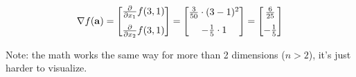 \documentclass[titlepage]{article}
\begin{document}
            \begin{align*}
              \nabla f(\mathbf{a})
                = \begin{bmatrix}
                    \vspace{1.5ex}
                    \frac{\partial}{\partial x_1} f(3, 1) \\
                    \frac{\partial}{\partial x_2} f(3, 1)
                  \end{bmatrix}
                = \begin{bmatrix}
                    \vspace{1.5ex}
                    \frac{3}{50} \cdot (3 - 1)^2 \\
                    - \frac{1}{5} \cdot 1
                  \end{bmatrix}
                = \begin{bmatrix}
                    \vspace{1.5ex}
                    \frac{6}{25} \\
                    - \frac{1}{5}
                  \end{bmatrix}
            \end{align*}

            Note: the math works the same way for more than 2 dimensions
            ($n > 2$), it's just harder to visualize.
\end{document}
